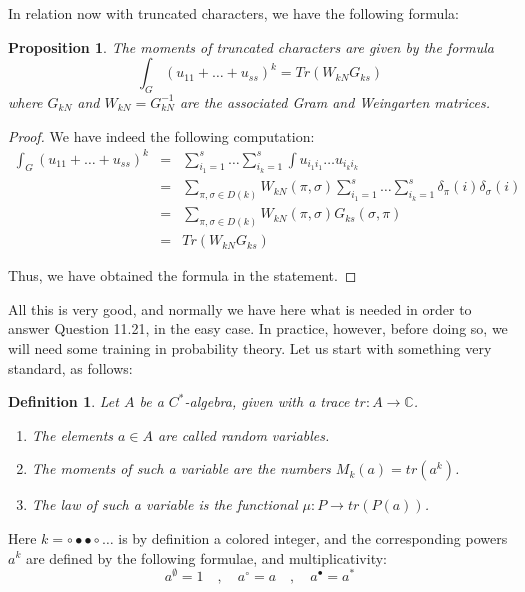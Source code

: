 \documentclass[12pt]{amsbook}
\newtheorem{definition}[theorem]{Definition}
\newtheorem{proposition}[theorem]{Proposition}
\begin{document}
In relation now with truncated characters, we have the following formula:


\begin{proposition}
The moments of truncated characters are given by the formula
$$\int_G(u_{11}+\ldots +u_{ss})^k=Tr(W_{kN}G_{ks})$$
where $G_{kN}$ and $W_{kN}=G_{kN}^{-1}$ are the associated Gram and Weingarten matrices.
\end{proposition}

\begin{proof}
We have indeed the following computation:
\begin{eqnarray*}
\int_G(u_{11}+\ldots +u_{ss})^k
&=&\sum_{i_1=1}^{s}\ldots\sum_{i_k=1}^s\int u_{i_1i_1}\ldots u_{i_ki_k}\\
&=&\sum_{\pi,\sigma\in D(k)}W_{kN}(\pi,\sigma)\sum_{i_1=1}^{s}\ldots\sum_{i_k=1}^s\delta_\pi(i)\delta_\sigma(i)\\
&=&\sum_{\pi,\sigma\in D(k)}W_{kN}(\pi,\sigma)G_{ks}(\sigma,\pi)\\
&=&Tr(W_{kN}G_{ks})
\end{eqnarray*}

Thus, we have obtained the formula in the statement.
\end{proof}

All this is very good, and normally we have here what is needed in order to answer Question 11.21, in the easy case. In practice, however, before doing so, we will need some training in probability theory.  Let us start with something very standard, as follows:

\begin{definition}
Let $A$ be a $C^*$-algebra, given with a trace $tr:A\to\mathbb C$.
\begin{enumerate}
\item The elements $a\in A$ are called random variables.

\item The moments of such a variable are the numbers $M_k(a)=tr(a^k)$.

\item The law of such a variable is the functional $\mu:P\to tr(P(a))$.
\end{enumerate}
\end{definition}

Here $k=\circ\bullet\bullet\circ\ldots$ is by definition a colored integer, and the corresponding powers $a^k$ are defined by the following formulae, and multiplicativity: 
$$a^\emptyset=1\quad,\quad
a^\circ=a\quad,\quad
a^\bullet=a^*$$
\end{document}
